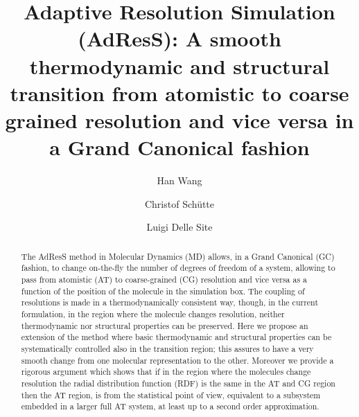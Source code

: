 \documentclass[aps,pre,preprint]{revtex4}
\begin{document}
\title{Adaptive Resolution Simulation (AdResS): A smooth thermodynamic and structural transition from atomistic to coarse grained resolution and vice versa in a Grand Canonical fashion}
\author{Han Wang}
\author{Christof Sch\"utte}
\author{Luigi Delle Site}


\begin{abstract}
The AdResS method in Molecular Dynamics (MD) allows, in a Grand Canonical (GC) fashion, to change on-the-fly the number of degrees of freedom of a system, allowing to pass from atomistic (AT) to coarse-grained (CG) resolution and vice versa as a function of the position of the molecule in the simulation box. The coupling of resolutions is made in a thermodynamically consistent way, though, in the current formulation, in the region where the molecule changes resolution, neither thermodynamic nor structural properties can be preserved. Here we propose an extension of the method where basic thermodynamic and structural properties can be systematically controlled also in the transition region; this assures to have a very smooth change from one molecular representation to the other. Moreover we provide a rigorous argument which shows that if in the region where the molecules change resolution the radial distribution function (RDF) is the same in the AT and CG region then the AT region, is from the statistical point of view, equivalent to a subsystem embedded in a larger full AT system, at least up to a second order approximation.    
\end{abstract}

\maketitle
\end{document}

